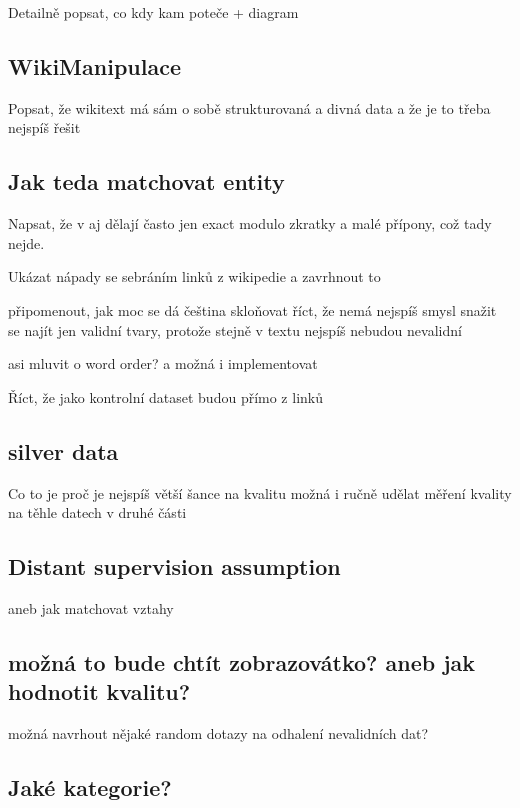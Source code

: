 Detailně popsat, co kdy kam poteče + diagram

\subsection{WikiManipulace}
Popsat, že wikitext má sám o sobě strukturovaná a divná data a že je to třeba nejspíš řešit

\subsection{Jak teda matchovat entity}

Napsat, že v aj dělají často jen exact modulo zkratky a malé přípony, což tady nejde.

Ukázat nápady se sebráním linků z wikipedie a zavrhnout to

připomenout, jak moc se dá čeština skloňovat
říct, že nemá nejspíš smysl snažit se najít jen validní tvary, protože stejně v textu nejspíš nebudou nevalidní

asi mluvit o word order? a možná i implementovat

Říct, že jako kontrolní dataset budou přímo z linků

\subsection{silver data}
Co to je
proč je nejspíš větší šance na kvalitu
možná i ručně udělat měření kvality na těhle datech v druhé části


\subsection{Distant supervision assumption}
aneb jak matchovat vztahy

\subsection{možná to bude chtít zobrazovátko? aneb jak hodnotit kvalitu?}
možná navrhout nějaké random dotazy na odhalení nevalidních dat?


\subsection{Jaké kategorie?}



